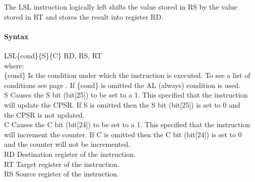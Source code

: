 \documentclass[12pt]{article}
\begin{document}
    \noindent
    The LSL instruction logically left shifts the value stored in RS by the value stored in RT and stores the result into register RD. 
    
    \paragraph{Syntax}
    \begin{flushleft}
    LSL\{cond\}\{S\}\{C\} RD, RS, RT\\
    \vspace{1em}        %
    where:\\
    \vspace{1em}
    \{cond\}    \hspace{2em} Is the condition under which the instruction is executed. To see a list of\\
                \hspace{5.4em} conditions see page . If \{cond\} is omitted the AL (always) condition is used.\\
    \vspace{1em}    
    S       \hspace{4.5em} Causes the S bit (bit[25]) to be set to a 1. This specified that the instruction\\
            \hspace{5.4em} will update the CPSR. If S is omitted then the S bit (bit[25]) is set to 0 and\\
            \hspace{5.4em} the CPSR is not updated.\\
    \vspace{1em}    
    C       \hspace{4.5em} Causes the C bit (bit[24]) to be set to a 1. This specified that the instruction\\
            \hspace{5.4em} will increment the counter. If C is omitted then the C bit (bit[24]) is set to 0\\
            \hspace{5.4em} and the counter will not be incremented.\\
    \vspace{1em}
    RD  \hspace{3.6em} Destination register of the instruction.\\
    \vspace{1em}
    RT  \hspace{3.7em} Target register of the instruction.\\
    \vspace{1em}
    RS  \hspace{3.85em} Source register of the instruction.\\
    \end{flushleft}
    
\end{document}
